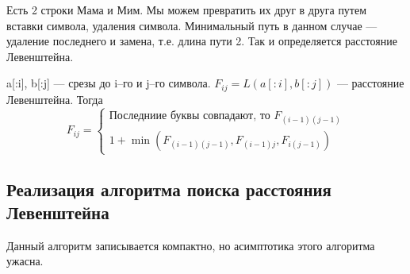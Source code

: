 Есть 2 строки Мама и Мим. Мы можем превратить их друг в друга путем вставки символа, удаления символа. Минимальный путь в данном случае --- удаление последнего и замена, т.е. длина пути 2. Так и определяется расстояние Левенштейна.

a[:i], b[:j] --- срезы до i--го и j--го символа.
$F_{ij} = L(a[:i], b[:j])$ --- расстояние Левенштейна. Тогда\\
$$F_{ij}=
\begin{cases}
\text{Последниие буквы совпадают, то } F_{(i-1)(j-1)}\\
1+\min(F_{(i-1)(j-1)}, F_{(i-1)j}, F_{i(j-1)})
\end{cases}
$$
\subsection{Реализация алгоритма поиска расстояния Левенштейна}
Данный алгоритм записывается компактно, но асимптотика этого алгоритма ужасна.

